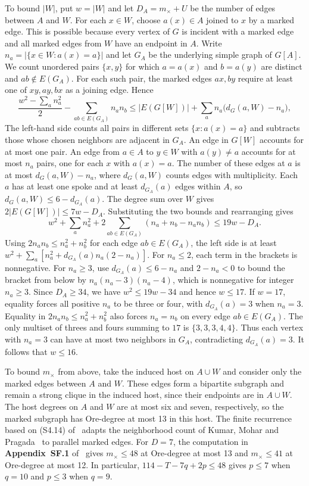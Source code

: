 \documentclass[preprint,11pt,numbers]{elsarticle-arxiv}
\numberwithin{equation}{section}
\theoremstyle{definition}
\begin{document}
To bound $|W|$, put $w=|W|$ and let $D_A=m_\times+U$ be the
number of edges between $A$ and $W$. For each $x\in W$, choose
$a(x)\in A$ joined to $x$ by a marked edge. This is possible
because every vertex of $G$ is incident with a marked edge
and all marked edges from $W$ have an endpoint in $A$. Write
$n_a=|\{x\in W:a(x)=a\}|$ and let $G_A$ be the underlying
simple graph of $G[A]$. We count unordered pairs $\{x,y\}$
for which $a=a(x)$ and $b=a(y)$ are distinct and
$ab\notin E(G_A)$. For each such pair, the marked edges $ax,by$
require at least one of $xy,ay,bx$ as a joining edge. Hence
\[
 \frac{w^2-\sum_a n_a^2}{2}
     -\sum_{ab\in E(G_A)}n_an_b
 \leq |E(G[W])|+\sum_a n_a\bigl(d_G(a,W)-n_a\bigr),
\]
The left-hand side counts all pairs in different sets
$\{x:a(x)=a\}$ and subtracts those whose chosen neighbors are
adjacent in $G_A$. An edge in $G[W]$ accounts for at most one
pair. An edge from $a\in A$ to $y\in W$ with $a(y)\ne a$ accounts
for at most $n_a$ pairs, one for each $x$ with $a(x)=a$. The
number of these edges at $a$ is at most $d_G(a,W)-n_a$, where
$d_G(a,W)$ counts edges with multiplicity. Each $a$ has at
least one spoke and at least $d_{G_A}(a)$ edges within $A$, so
$d_G(a,W)\leq6-d_{G_A}(a)$. The degree sum over $W$ gives
$2|E(G[W])|\leq7w-D_A$. Substituting the two bounds and
rearranging gives
\[
  w^2+\sum_a n_a^2+2\sum_{ab\in E(G_A)}(n_a+n_b-n_an_b)
 \leq19w-D_A.
\]
Using $2n_an_b\leq n_a^2+n_b^2$ for each edge $ab\in E(G_A)$,
the left side is at least
$w^2+\sum_a[n_a^2+d_{G_A}(a)n_a(2-n_a)]$.
For $n_a\leq2$, each term in the brackets is nonnegative.
For $n_a\geq3$, use $d_{G_A}(a)\leq6-n_a$ and $2-n_a<0$ to
bound the bracket from below by $n_a(n_a-3)(n_a-4)$, which
is nonnegative for integer $n_a\geq3$. Since $D_A\geq34$,
we have $w^2\leq19w-34$ and hence $w\leq17$.
If $w=17$, equality forces all positive $n_a$ to be three
or four, with $d_{G_A}(a)=3$ when $n_a=3$. Equality in
$2n_an_b\leq n_a^2+n_b^2$ also forces $n_a=n_b$ on every edge
$ab\in E(G_A)$. The only multiset of threes and fours summing
to $17$ is $\{3,3,3,4,4\}$. Thus each vertex with $n_a=3$ can
have at most two neighbors in $G_A$, contradicting
$d_{G_A}(a)=3$.
It follows that $w\leq16$.

To bound $m_\times$ from above, take the induced host on $A\cup W$
and consider only the marked edges between $A$ and $W$.
These edges form a bipartite subgraph and remain a strong clique
in the induced host, since their endpoints are in $A\cup W$.
The host degrees on
$A$ and $W$ are at most six and seven, respectively, so the marked
subgraph has Ore-degree at most 13 in this host. The finite recurrence
based on (S4.14) of~\cite{FGSTSupplement} adapts the neighborhood count
of Kumar, Mohar and Pragada~\cite{KumarMoharPragada2026} to parallel
marked edges. For $D=7$, the computation in \textbf{Appendix~SF.1}
of~\cite{FGSTSupplement}
gives $m_\times\leq48$ at Ore-degree at most 13 and
$m_\times\leq41$ at Ore-degree at most 12. In particular,
$114-T-7q+2p\leq48$ gives $p\leq7$ when $q=10$
and $p\leq3$ when $q=9$.
\end{document}
